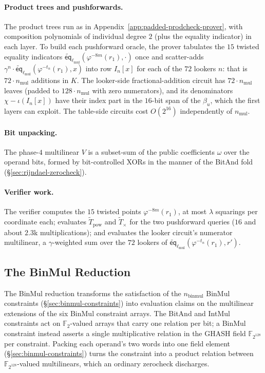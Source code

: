 \documentclass{article}
\theoremstyle{definition}
\newcommand*{\mle}{\widetilde}
\newcommand{\eq}{\mathsf{eq}}
\newcommand{\FF}[1]{\mathbb{F}_{#1}}
\begin{document}
\paragraph{Product trees and pushforwards.}
The product trees run as in Appendix~\ref{app:padded-prodcheck-prover}, with composition polynomials of individual degree $2$ (plus the equality indicator) in each layer. To build each pushforward oracle, the prover tabulates the $15$ twisted equality indicators $\mle{\eq}_{\ell_\text{mul}}(\varphi^{-8m}(r_1), \cdot)$ once and scatter-adds $\gamma^n \cdot \mle{\eq}_{\ell_\text{mul}}(\varphi^{-t_n}(r_1), x)$ into row $I_n[x]$ for each of the $72$ lookers $n$: that is $72 \cdot n_\text{mul}$ additions in $K$. The looker-side fractional-addition circuit has $72 \cdot n_\text{mul}$ leaves (padded to $128 \cdot n_\text{mul}$ with zero numerators), and its denominators $\chi - \iota(I_n[x])$ have their index part in the $16$-bit span of the $\beta_u$, which the first layers can exploit. The table-side circuits cost $O(2^{16})$ independently of $n_\text{mul}$.

\paragraph{Bit unpacking.}
The phase-$4$ multilinear $V$ is a subset-sum of the public coefficients $\omega$ over the operand bits, formed by bit-controlled XORs in the manner of the BitAnd fold (\S\ref{sec:rijndael-zerocheck}).

\paragraph{Verifier work.}
The verifier computes the $15$ twisted points $\varphi^{-8m}(r_1)$, at most $\lambda$ squarings per coordinate each; evaluates $\mle{T}_\text{pow}$ and $\mle{T}_\times$ for the two pushforward queries ($16$ and about $2.3$k multiplications); and evaluates the looker circuit's numerator multilinear, a $\gamma$-weighted sum over the $72$ lookers of $\mle{\eq}_{\ell_\text{mul}}(\varphi^{-t_n}(r_1), r')$.

\subsection{The BinMul Reduction}
\label{sec:binmul}

The BinMul reduction transforms the satisfaction of the $n_\text{binmul}$ BinMul constraints (\S\ref{sec:binmul-constraints}) into evaluation claims on the multilinear extensions of the six BinMul constraint arrays. The BitAnd and IntMul constraints act on $\FF{2}$-valued arrays that carry one relation per bit; a BinMul constraint instead asserts a single multiplicative relation in the GHASH field $\FF{2^{128}}$ per constraint. Packing each operand's two words into one field element (\S\ref{sec:binmul-constraints}) turns the constraint into a product relation between $\FF{2^{128}}$-valued multilinears, which an ordinary zerocheck discharges.
\end{document}
